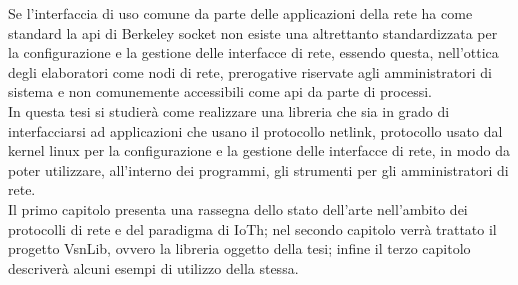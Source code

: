 Se l'interfaccia di uso comune da parte delle applicazioni della rete ha come standard la api di Berkeley socket non esiste una altrettanto standardizzata per la configurazione e la gestione delle interfacce di rete, essendo questa, nell'ottica degli elaboratori come nodi di rete, prerogative riservate agli amministratori di sistema e non comunemente accessibili come api da parte di processi.\\
In questa tesi si studier\`a come realizzare una libreria che sia in grado di interfacciarsi ad applicazioni che usano il protocollo netlink, protocollo usato dal kernel linux per la configurazione e la gestione delle interfacce di rete, in modo da poter utilizzare, all'interno dei programmi, gli strumenti per gli amministratori di rete.\\
Il primo capitolo presenta una rassegna dello stato dell'arte nell'ambito dei protocolli di rete e del paradigma di IoTh; nel secondo capitolo verr\`a trattato il progetto VsnLib, ovvero la libreria oggetto della tesi; infine il terzo capitolo descriver\`a alcuni esempi di utilizzo della stessa.
\clearpage{\pagestyle{empty}\cleardoublepage}
\tableofcontents                        %
\rhead[\fancyplain{}{\bfseries\leftmark}]{\fancyplain{}{\bfseries\thepage}}
\clearpage{\pagestyle{empty}\cleardoublepage}
\listoffigures                          %
\clearpage{\pagestyle{empty}\cleardoublepage}
\listoftables                           %
\clearpage{\pagestyle{empty}\cleardoublepage}
